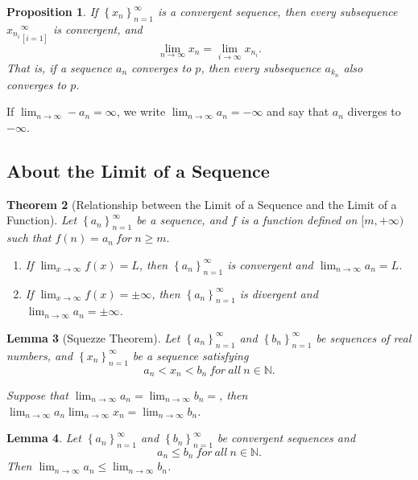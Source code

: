 \documentclass{article}
\newtheorem{theorem}{Theorem}[section]
\newtheorem{lemma}[theorem]{Lemma}
\newtheorem{prop}[theorem]{Proposition}
\theoremstyle{definition}
\begin{document}
\begin{prop}
    If $\left\{x_{n}\right\}_{n=1}^{\infty}$ is a convergent sequence, then every subsequence ${x_{n_{i}}}_[i=1]^{\infty}$ is convergent, and 
    $$\lim_{n\to \infty}x_{n}=\lim_{i\to \infty}x_{n_{i}}.$$ 
    That is, if a sequence ${a_{n}}$ converges to $p$, then every subsequence ${a_{k_{n}}}$ also converges to $p$.

\end{prop}



If $\lim_{n\rightarrow\infty}-a_{n}=\infty$, we write $\lim_{n\rightarrow\infty}a_{n}=-\infty$ and say that $a_{n}$ 
diverges to $-\infty$. 


\subsection{About the Limit of a Sequence}

\begin{theorem}[Relationship between the Limit of a Sequence and the Limit of a Function]
    Let $\left\{a_{n}\right\}_{n=1}^{\infty}$ be a sequence, and $f$ is a function defined on $[m,+\infty)$ such that $f(n)=a_{n}\ for\ n\geq m.$
    \begin{enumerate}
        \item If $\lim_{x\to\infty}f(x)=L$, then $\left\{a_{n}\right\}_{n=1}^{\infty}$ is convergent and $\lim_{n\rightarrow\infty}a_{n}=L$.
        \item If $\lim_{x\to\infty}f(x)=\pm \infty$, then $\left\{a_{n}\right\}_{n=1}^{\infty}$ is divergent and $\lim_{n\rightarrow\infty}a_{n}=\pm \infty$.
    \end{enumerate}
\end{theorem}


\begin{lemma}[Squezze Theorem]

    Let $\left\{a_{n}\right\}_{n=1}^{\infty}$ and $\left\{b_{n}\right\}_{n=1}^{\infty}$ be sequences of real numbers, and $\left\{x_{n}\right\}_{n=1}^{\infty}$
     be a sequence satisfying 
     $$a_{n}<x_{n}<b_{n}\ for\ all\ n\in\mathbb{N}.$$

    Suppose that $\lim_{n\rightarrow\infty}a_{n}=\lim_{n\rightarrow\infty}b_{n}=$,
    then $\lim_{n\rightarrow\infty}a_{n}\lim_{n\rightarrow\infty}x_{n}=\lim_{n\rightarrow\infty}b_{n}$.
    
\end{lemma}

\begin{lemma}
    
    Let $\left\{a_{n}\right\}_{n=1}^{\infty}$ and $\left\{b_{n}\right\}_{n=1}^{\infty}$ be convergent sequences and 
    $$a_{n}\leq b_{n}\ for\ all\ n\in \mathbb{N}.$$
    Then $\lim_{n\rightarrow\infty}a_{n}\leq \lim_{n\rightarrow\infty}b_{n}$.
\end{lemma}
\end{document}
